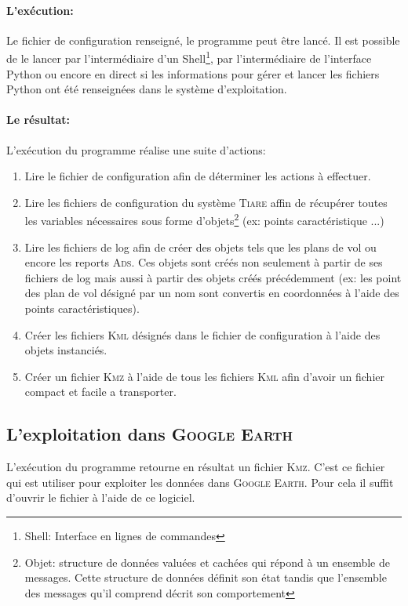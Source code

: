             \paragraph{L'exécution:}
Le fichier de configuration renseigné, le programme peut être lancé. Il est possible de le lancer par l'intermédiaire d'un Shell\footnote{Shell: Interface en lignes de commandes}, par l'intermédiaire de l'interface Python ou encore en direct si les informations pour gérer et lancer les fichiers Python ont été renseignées dans le système d'exploitation.
            \paragraph{Le résultat:}
L'exécution du programme réalise une suite d'actions:
\begin{enumerate}
    \item Lire le fichier de configuration afin de déterminer les actions à effectuer.
    \item Lire les fichiers de configuration du système \textsc{Tiare} affin de récupérer toutes les variables nécessaires sous forme d'objets\footnote{Objet: structure de données valuées et cachées qui répond à un ensemble de messages. Cette structure de données définit son état tandis que l'ensemble des messages qu'il comprend décrit son comportement} (ex: points caractéristique ...)
    \item Lire les fichiers de log afin de créer des objets tels que les plans de vol ou encore les reports \textsc{Ads}. Ces objets sont créés non seulement à partir de ses fichiers de log mais aussi à partir des objets créés précédemment (ex: les point des plan de vol désigné par un nom sont convertis en coordonnées à l'aide des points caractéristiques).
    \item Créer les fichiers \textsc{Kml} désignés dans le fichier de configuration à l'aide des objets instanciés.
    \item Créer un fichier \textsc{Kmz} à l'aide de tous les fichiers \textsc{Kml} afin d'avoir un fichier compact et facile a transporter.
\end{enumerate}

    \subsection{L'exploitation dans \textsc{Google Earth}}
L'exécution du programme retourne en résultat un fichier \textsc{Kmz}. C'est ce fichier qui est utiliser pour exploiter les données dans \textsc{Google Earth}. Pour cela il suffit d'ouvrir le fichier à l'aide de ce logiciel.

